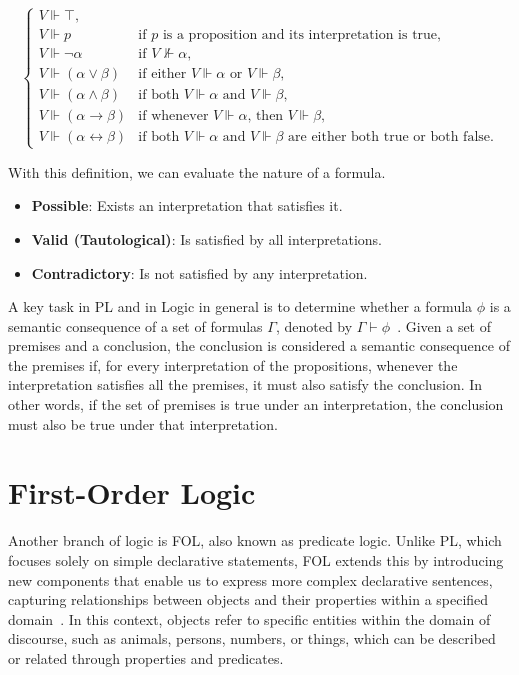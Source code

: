 \[
\left\{
\begin{array}{ll}
    V \Vdash \top \text{,}\\
    V \Vdash p  & \text{if } p \text{ is a proposition and its interpretation is true}, \\
    V \Vdash \neg \alpha & \text{if } V \nVdash \alpha \text{,} \\
    V \Vdash (\alpha \lor \beta) & \text{if either } V \Vdash \alpha \text{ or } V \Vdash \beta \text{,} \\
    V \Vdash (\alpha \land \beta) & \text{if both } V \Vdash \alpha \text{ and } V \Vdash  \beta \text{,} \\
    V \Vdash (\alpha \rightarrow \beta) & \text{if whenever } V \Vdash \alpha \text{, then } V \Vdash \beta\text{,} \\
    V \Vdash (\alpha \leftrightarrow \beta) & \text{if both } V \Vdash \alpha \text{ and } V \Vdash \beta \text{ are either both true or both false.}
\end{array}
\right.
\]

With this definition, we can evaluate the nature of a formula.

\begin{itemize}[itemsep=2pt]
    \renewcommand{\labelitemi}{}
    \item \textbf{Possible}: Exists an interpretation that satisfies it.
    \item \textbf{Valid (Tautological)}: Is satisfied by all interpretations.
    \item \textbf{Contradictory}: Is not satisfied by any interpretation.
\end{itemize}

A key task in \gls{PL} and in Logic in general is to determine whether a formula \(\phi\) is a semantic consequence of a set of formulas \(\Gamma\), denoted by \(\Gamma \vdash \phi\)~\cite{gouveia_lgica}. Given a set of premises and a conclusion, the conclusion is considered a semantic consequence of the premises if, for every interpretation of the propositions, whenever the interpretation satisfies all the premises, it must also satisfy the conclusion. In other words, if the set of premises is true under an interpretation, the conclusion must also be true under that interpretation.

\section{First-Order Logic}
\label{chap:fol}
Another branch of logic is \gls{FOL}, also known as predicate logic. Unlike \gls{PL}, which focuses solely on simple declarative statements, \gls{FOL} extends this by introducing new components that enable us to express more complex declarative sentences, capturing relationships between objects and their properties within a specified domain~\cite{huth_2004_logic}. In this context, objects refer to specific entities within the domain of discourse, such as animals, persons, numbers, or things, which can be described or related through properties and predicates.

